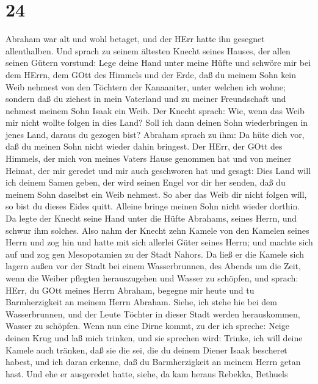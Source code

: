 \hypertarget{section-23}{%
\section{24}\label{section-23}}

 Abraham war alt und wohl betaget, und der HErr hatte ihn
gesegnet allenthalben.  Und sprach zu seinem ältesten Knecht
seines Hauses, der allen seinen Gütern vorstund: Lege deine Hand unter
meine Hüfte  und schwöre mir bei dem HErrn, dem GOtt des
Himmels und der Erde, daß du meinem Sohn kein Weib nehmest von den
Töchtern der Kanaaniter, unter welchen ich wohne;  sondern
daß du ziehest in mein Vaterland und zu meiner Freundschaft und nehmest
meinem Sohn Isaak ein Weib.  Der Knecht sprach: Wie, wenn
das Weib mir nicht wollte folgen in dies Land? Soll ich dann deinen Sohn
wiederbringen in jenes Land, daraus du gezogen bist? 
Abraham sprach zu ihm: Da hüte dich vor, daß du meinen Sohn nicht wieder
dahin bringest.  Der HErr, der GOtt des Himmels, der mich
von meines Vaters Hause genommen hat und von meiner Heimat, der mir
geredet und mir auch geschworen hat und gesagt: Dies Land will ich
deinem Samen geben, der wird seinen Engel vor dir her senden, daß du
meinem Sohn daselbst ein Weib nehmest.  So aber das Weib dir
nicht folgen will, so bist du dieses Eides quitt. Alleine bringe meinen
Sohn nicht wieder dorthin.  Da legte der Knecht seine Hand
unter die Hüfte Abrahams, seines Herrn, und schwur ihm solches.
 Also nahm der Knecht zehn Kamele von den Kamelen seines
Herrn und zog hin und hatte mit sich allerlei Güter seines Herrn; und
machte sich auf und zog gen Mesopotamien zu der Stadt Nahors.
 Da ließ er die Kamele sich lagern außen vor der Stadt bei
einem Wasserbrunnen, des Abends um die Zeit, wenn die Weiber pflegten
herauszugehen und Wasser zu schöpfen,  und sprach: HErr, du
GOtt meines Herrn Abraham, begegne mir heute und tu Barmherzigkeit an
meinem Herrn Abraham.  Siehe, ich stehe hie bei dem
Wasserbrunnen, und der Leute Töchter in dieser Stadt werden
herauskommen, Wasser zu schöpfen.  Wenn nun eine Dirne
kommt, zu der ich spreche: Neige deinen Krug und laß mich trinken, und
sie sprechen wird: Trinke, ich will deine Kamele auch tränken, daß sie
die sei, die du deinem Diener Isaak bescheret habest, und ich daran
erkenne, daß du Barmherzigkeit an meinem Herrn getan hast. 
Und ehe er ausgeredet hatte, siehe, da kam heraus Rebekka, Bethuels
